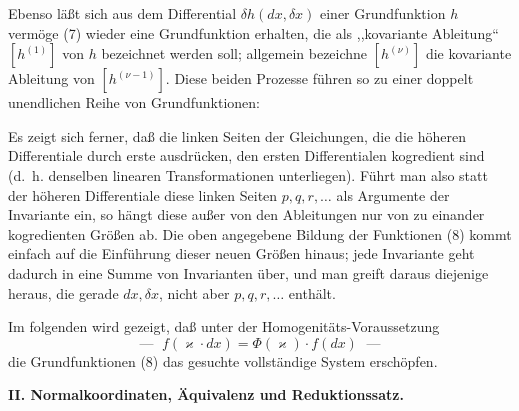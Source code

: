 Ebenso läßt sich aus dem Differential \(\delta h(dx,\delta x)\) einer
Grundfunktion \(h\) vermöge (7) wieder eine Grundfunktion erhalten, die
als ,,kovariante Ableitung`` \([h^{(1)}]\) von \(h\) bezeichnet werden
soll; allgemein bezeichne \([h^{(\nu)}]\) die kovariante Ableitung von
\([h^{(\nu-1)}]\). Diese beiden Prozesse führen so zu einer doppelt
unendlichen Reihe von Grundfunktionen:

Es zeigt sich ferner, daß die linken Seiten der Gleichungen, die die
höheren Differentiale durch erste ausdrücken, den ersten Differentialen
kogredient sind (d.~h. denselben linearen Transformationen unterliegen).
Führt man also statt der höheren Differentiale diese linken Seiten
\(p,q,r,\ldots\) als Argumente der Invariante ein, so hängt diese außer
von den Ableitungen nur von zu einander kogredienten Größen ab. Die
oben angegebene Bildung der Funktionen (8) kommt einfach auf die
Einführung dieser neuen Größen hinaus; jede Invariante geht dadurch in
eine Summe von Invarianten über, und man greift daraus diejenige heraus,
die gerade \(dx,\delta x\), nicht aber \(p,q,r,\ldots\) enthält.

Im folgenden wird gezeigt, daß unter der Homogenitäts-Voraussetzung
\[
\text{--- }\;f(\varkappa\cdot dx)=\Phi(\varkappa)\cdot f(dx)\;\text{ ---}
\]
die Grundfunktionen (8) das gesuchte vollständige System erschöpfen.

\begin{center}
\textbf{II. Normalkoordinaten, Äquivalenz und Reduktionssatz.}
\end{center}

